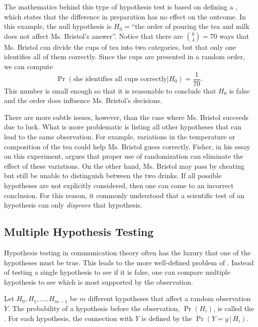 The mathematics behind this type of hypothesis test is based on defining a , which states that the difference in preparation has no effect on the outcome.
In this example, the null hypothesis is $H_0 = $``the order of pouring the tea and milk does not affect Ms. Bristol's answer''.
Notice that there are $\binom{8}{4}=70$ ways that Ms. Bristol can divide the cups of tea into two categories, but that only one identifies all of them correctly.
Since the cups are presented in a random order, we can compute
\[ \Pr (\text{she identifies all cups correctly} | H_0) = \frac{1}{70}. \]
This number is small enough so that it is reasonable to conclude that $H_0$ is false and the order does influence Ms. Bristol's decisions.

There are more subtle issues, however, than the case where Ms. Bristol succeeds due to luck.
What is more problematic is listing all other hypotheses that can lead to the same observation.
For example, variations in the temperature or composition of the tea could help Ms. Bristol guess correctly.
Fisher, in his essay on this experiment, argues that proper use of randomization can eliminate the effect of these variations.
On the other hand, Ms. Bristol may pass by cheating but still be unable to distinguish between the two drinks.
If all possible hypotheses are not explicitly considered, then one can come to an incorrect conclusion.
For this reason, it commonly understood that a scientific test of an hypothesis can only \emph{disprove} that hypothesis.

\subsection{Multiple Hypothesis Testing}

Hypothesis testing in communication theory often has the luxury that one of the hypotheses must be true.
This leads to the more well-defined problem of .
Instead of testing a single hypothesis to see if it is false, one can compare multiple hypothesis to see which is most supported by the observation.

Let $H_0,H_1,\ldots,H_{m-1}$ be $m$ different hypotheses that affect a random observation $Y$.
The probability of a hypothesis before the observation, $\Pr(H_i)$, is called the .
For each hypothesis, the connection with $Y$ is defined by the  $\Pr (Y=y \, | \, H_i)$.

